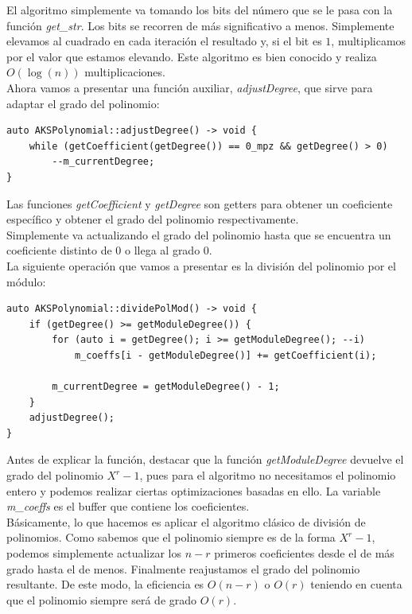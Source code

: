 El algoritmo simplemente va tomando los bits del número que se le pasa con la función \textit{get\_str}. Los bits se recorren de más significativo a menos. Simplemente elevamos al cuadrado en cada iteración el resultado y, si el bit es $1$, multiplicamos por el valor que estamos elevando. Este algoritmo es bien conocido y realiza $O(\log(n))$ multiplicaciones.\\

Ahora vamos a presentar una función auxiliar, \textit{adjustDegree}, que sirve para adaptar el grado del polinomio:\\

\begin{lstlisting}
auto AKSPolynomial::adjustDegree() -> void {
	while (getCoefficient(getDegree()) == 0_mpz && getDegree() > 0)
		--m_currentDegree;
}
\end{lstlisting}

Las funciones \textit{getCoefficient} y \textit{getDegree} son getters para obtener un coeficiente específico y obtener el grado del polinomio respectivamente.\\

Simplemente va actualizando el grado del polinomio hasta que se encuentra un coeficiente distinto de $0$ o llega al grado $0$.\\

La siguiente operación que vamos a presentar es la división del polinomio por el módulo:\\

\begin{lstlisting}
auto AKSPolynomial::dividePolMod() -> void {
	if (getDegree() >= getModuleDegree()) {
		for (auto i = getDegree(); i >= getModuleDegree(); --i)
			m_coeffs[i - getModuleDegree()] += getCoefficient(i);
		
		m_currentDegree = getModuleDegree() - 1;
	}
	adjustDegree();
}
\end{lstlisting}

Antes de explicar la función, destacar que la función \textit{getModuleDegree} devuelve el grado del polinomio $X^r - 1$, pues para el algoritmo no necesitamos el polinomio entero y podemos realizar ciertas optimizaciones basadas en ello. La variable \textit{m\_coeffs} es el buffer que contiene los coeficientes.\\

Básicamente, lo que hacemos es aplicar el algoritmo clásico de división de polinomios. Como sabemos que el polinomio siempre es de la forma $X^r - 1$, podemos simplemente actualizar los $n - r$ primeros coeficientes desde el de más grado hasta el de menos. Finalmente reajustamos el grado del polinomio resultante. De este modo, la eficiencia es $O(n - r)$ o $O(r)$ teniendo en cuenta que el polinomio siempre será de grado $O(r)$.\\

